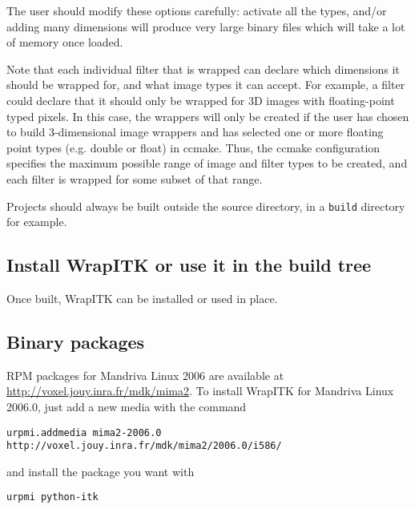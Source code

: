 \documentclass{InsightArticle}
\begin{document}
The user should modify these options carefully: activate all the types, and/or
adding many dimensions will produce very large binary files which will take a lot
of memory once loaded.

Note that each individual filter that is wrapped can declare which dimensions it
should be wrapped for, and what image types it can accept. For example, a filter
could declare that it should only be wrapped for 3D images with floating-point
typed pixels. In this case, the wrappers will only be created if the user has
chosen to build 3-dimensional image wrappers and has selected one or more
floating point types (e.g. double or float) in ccmake. Thus, the ccmake
configuration specifies the maximum possible range of image and filter types to
be created, and each filter is wrapped for some subset of that range. 

Projects should always be built outside the source directory, in a \verb$build$
directory for example.

    \subsection{Install WrapITK or use it in the build tree}

Once built, WrapITK can be installed or used in place.

    \subsection{Binary packages}

RPM packages for Mandriva Linux 2006 are available at \url{http://voxel.jouy.inra.fr/mdk/mima2}.
To install WrapITK for Mandriva Linux 2006.0, just add a new media with the
command

\begin{verbatim}
urpmi.addmedia mima2-2006.0 http://voxel.jouy.inra.fr/mdk/mima2/2006.0/i586/
\end{verbatim}

and install the package you want with 

\begin{verbatim}
urpmi python-itk
\end{verbatim}
\end{document}
